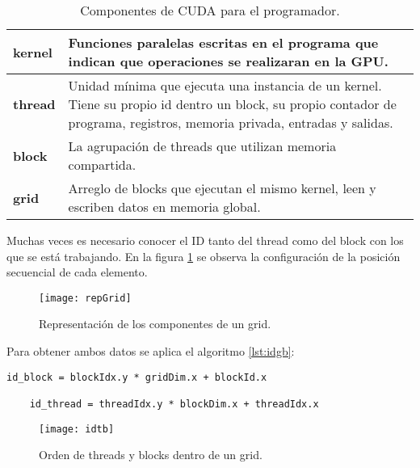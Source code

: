      \begin{table}[h!]
      \begin{center}
            \footnotesize
        \begin{tabular}{|m{1.5cm}|m{8.5cm}|}
         \hline
         \cellcolor{lightgray}\textbf{kernel} & Funciones paralelas escritas en el programa que indican que operaciones se realizaran en la GPU.\\ 
         \hline
          \cellcolor{lightgray}\textbf{thread} & Unidad mínima que ejecuta una instancia de un kernel. Tiene su propio id dentro un block, su propio contador de programa, registros, memoria privada, entradas y salidas.\\ 
         \hline  
         \cellcolor{lightgray}\textbf{block} & La agrupación de threads que utilizan memoria compartida.\\ 
         \hline
         \cellcolor{lightgray}\textbf{grid} & Arreglo de blocks que ejecutan el mismo kernel, leen y escriben datos en memoria global.\\ 
         \hline
           \end{tabular}
        \caption{Componentes de CUDA para el programador.}
        \label{tab:CUDAcomp}
      \end{center}
    \end{table}
    
    Muchas veces es necesario conocer el ID tanto del thread como del block con los que se está trabajando. En la figura \ref{fig:grid} se observa la configuración de la posición secuencial de cada elemento.
    
    \begin{figure}[ht]
      \centering
        \texttt{[image: repGrid]}
        \caption{Representación de los componentes de un grid\cite{CUDAP}.}
        \label{fig:grid}
    \end{figure}

    Para obtener ambos datos se aplica el algoritmo \ref{lst:idgb}:
    
    \begin{lstlisting}[style=CStyle, frame=single,label=lst:idgb,  basicstyle=\ttfamily\footnotesize, caption=Transformación para obtener el id del thread y del block.] 
    id_block = blockIdx.y * gridDim.x + blockId.x
    
    id_thread = threadIdx.y * blockDim.x + threadIdx.x
    \end{lstlisting}
    
    \begin{figure}[ht]
      \centering
        \texttt{[image: idtb]}
        \caption{Orden de threads y blocks dentro de un grid\cite{CUDAP}.}
        \label{fig:threadOrden}
    \end{figure}
    
